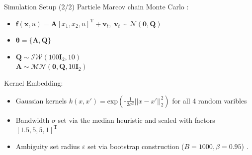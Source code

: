 \documentclass[student, noshadow, itr, english, aspectratio=169]{ITR_LSR_slides}
\begin{document}
\begin{frame}{Simulation Setup (2/2)}
Particle Marcov chain Monte Carlo \cite{Svensson_17}:
\begin{itemize}
\item 
{} $\boldsymbol{f}(\boldsymbol{x}, u) = \boldsymbol{A} \left[ x_1,  x_2,  u \right]^\text{T} + \boldsymbol{v}_{t}, \; \boldsymbol{v}_{t} \sim \mathcal{N} (\boldsymbol{0}, \boldsymbol{Q})$ 
\item 
{} $\boldsymbol{\theta} = \{\boldsymbol{A}, \boldsymbol{Q}\}$
\item
{} $\boldsymbol{Q} \sim \mathcal{IW} (100 \boldsymbol{I}_2, 10)$ \\
\makebox[4.5cm]{\hfill} $\boldsymbol{A} \sim \mathcal{MN} (\boldsymbol{0}, \boldsymbol{Q}, 10 \boldsymbol{I}_2)$ 
\end{itemize}

Kernel Embedding:
\begin{itemize}
\item Gaussian kernels $k(x,x') = \text{exp}\left(\text{-}\frac{1}{2\sigma^2} ||x - x'||_2^2 \right)$ for all 4 random varibles
\item Bandwidth $\sigma$ set via the median heuristic \cite{Damien_18} and scaled with factors $\left[ 1.5, 5, 5, 1 \right]^\text{T}$
\item Ambiguity set radius $\varepsilon$ set via bootstrap construction ($B = 1000, \beta = 0.95$) \cite{Yassine_22}.
\end{itemize}
\end{frame}	
\end{document}

